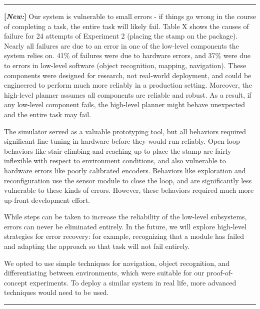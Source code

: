 \documentclass[conference]{IEEEtran}
\newcommand{\separator}{ \noindent \rule{\columnwidth}{1pt} }
\newenvironment{new}{\color{Blue} \separator \textbf{[\textit{New:}]} }{\ignorespacesafterend \separator}
\begin{document}
\begin{new}
Our system is vulnerable to small errors - if things go wrong in the course of completing a task, the entire task will likely fail. 
Table X shows the causes of failure for 24 attempts of Experiment 2 (placing the stamp on the package).  
Nearly all failures are due to an error in one of the low-level components the system relies on. 
41\% of failures were due to hardware errors, and 37\% were due to errors in low-level software (object recognition, mapping, navigation). 
These components were designed for research, not real-world deployment, and could be engineered to perform much more reliably in a production setting. 
Moreover, the high-level planner assumes all components are reliable and robust. 
As a result, if any low-level component fails, the high-level planner might behave unexpected and the entire task may fail.

The simulator served as a valuable prototyping tool, but all behaviors required significant fine-tuning in hardware before they would run reliably.  
Open-loop behaviors like stair-climbing and reaching up to place the stamp are fairly inflexible with respect to environment conditions, and also vulnerable to hardware errors like poorly calibrated encoders.  
Behaviors like exploration and reconfiguration use the sensor module to close the loop, and are significantly less vulnerable to these kinds of errors.  
However, these behaviors required much more up-front development effort.

While steps can be taken to increase the reliability of the low-level subsystems, errors can never be eliminated entirely.  In the future, we will explore high-level strategies for error recovery: for example, recognizing that a module has failed and adapting the approach so that task will not fail entirely.

We opted to use simple techniques for navigation, object recognition, and differentiating between environments, which were suitable for our proof-of-concept experiments.  To deploy a similar system in real life, more advanced techniques would need to be used.
\end{new}
%
\end{document}
